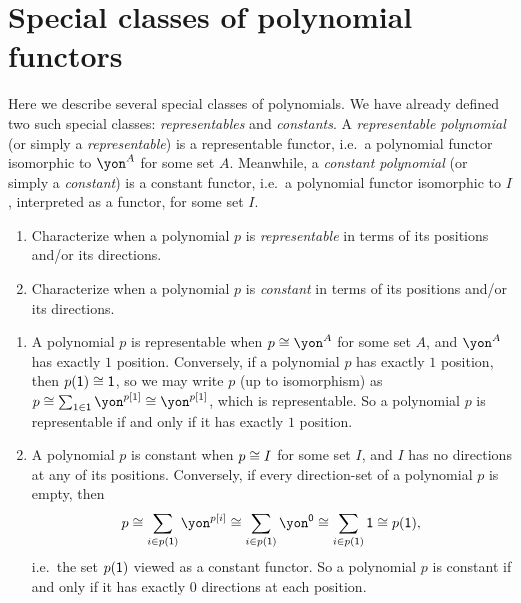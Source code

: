 \documentclass[Book-Poly]{subfiles}
\begin{document}
\section{Special classes of polynomial functors} \label{sec.poly.obj.spec}

Here we describe several special classes of polynomials.
We have already defined two such special classes: \emph{representables} and \emph{constants}.
A \emph{representable polynomial} (or simply a \emph{representable}) is a representable functor, i.e.\ a polynomial functor isomorphic to $\yon^A$ for some set $A$.
Meanwhile, a \emph{constant polynomial} (or simply a \emph{constant}) is a constant functor, i.e.\ a polynomial functor isomorphic to $I$, interpreted as a functor, for some set $I$.

\begin{exercise}
\begin{enumerate}
  \item Characterize when a polynomial $p$ is \textit{representable} in terms of its positions and/or its directions.
  \item Characterize when a polynomial $p$ is \textit{constant} in terms of its positions and/or its directions. \qedhere
\end{enumerate}
\begin{solution}
\begin{enumerate}
  \item A polynomial $p$ is representable when $p\iso\yon^A$ for some set $A$, and $\yon^A$ has exactly $1$ position.
  Conversely, if a polynomial $p$ has exactly $1$ position, then $p(\textsf{1})\cong\textsf{1}$, so we may write $p$ (up to isomorphism) as $p\iso\sum_{1\in\1}\yon^{p[1]}\iso\yon^{p[1]}$, which is representable.
  So a polynomial $p$ is representable if and only if it has exactly $1$ position.

  \item A polynomial $p$ is constant when $p\cong I$ for some set $I$, and $I$ has no directions at any of its positions.
  Conversely, if every direction-set of a polynomial $p$ is empty, then
  \[
    p\iso\sum_{i\in p(\1)}\yon^{p[i]}\iso\sum_{i\in p(\1)}\yon^\0\iso\sum_{i\in p(\1)}\1\iso p(\1),
  \]
  i.e.\ the set $p(\textsf{1})$ viewed as a constant functor.
  So a polynomial $p$ is constant if and only if it has exactly $0$ directions at each position.
\end{enumerate}
\end{solution}
\end{exercise}
\end{document}
